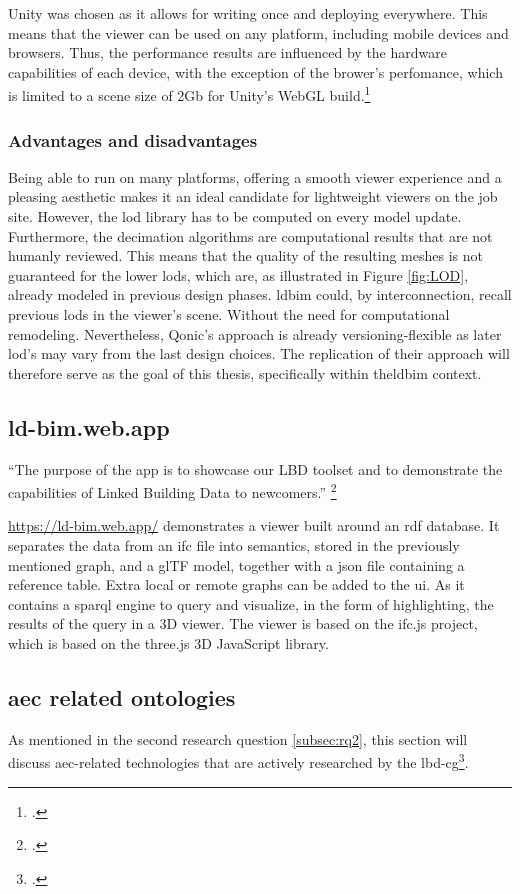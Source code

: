 Unity was chosen as it allows for writing once and deploying everywhere. This means that the viewer can be used on any platform, including mobile devices and browsers. Thus, the performance results are influenced by the hardware capabilities of each device, with the exception of the brower's perfomance, which is limited to a scene size of 2Gb for Unity's WebGL build.\footcite{UnityWebGL}

\subsubsection{Advantages and disadvantages}
Being able to run on many platforms, offering a smooth viewer experience and a pleasing aesthetic makes it an ideal candidate for lightweight viewers on the job site. However, the \ac{lod} library has to be computed on every model update. Furthermore, the decimation algorithms are computational results that are not humanly reviewed. This means that the quality of the resulting meshes is not guaranteed for the lower \ac{lod}s, which are, as illustrated in Figure \ref{fig:LOD}, already modeled in previous design phases. \ac{ldbim} could, by interconnection, recall previous \ac{lod}s in the viewer's scene. Without the need for computational remodeling. Nevertheless, Qonic's approach is already versioning-flexible as later \ac{lod}'s may vary from the last design choices. The replication of their approach will therefore serve as the goal of this thesis, specifically within the\ac{ldbim} context.

\subsection{ld-bim.web.app}
\enquote{The purpose of the app is to showcase our LBD toolset and to demonstrate the capabilities of Linked Building Data to newcomers.} \footcite{lbdimApp}

\url{https://ld-bim.web.app/} demonstrates a viewer built around an \ac{rdf} database. It separates the data from an \ac{ifc} file into semantics, stored in the previously mentioned graph, and a glTF model, together with a \ac{json} file containing a reference table. Extra local or remote graphs can be added to the \ac{ui}. As it contains a \ac{sparql} engine to query and visualize, in the form of highlighting, the results of the query in a 3D viewer. The viewer is based on the ifc.js project, which is based on the three.js 3D JavaScript library.

\subsection{\acs{aec} related ontologies}
As mentioned in the second research question \ref{subsec:rq2}, this section will discuss \ac{aec}-related technologies that are actively researched by the \ac{lbd-cg}\footcite{lbdOntologies}.

